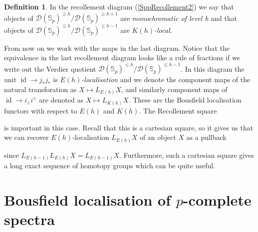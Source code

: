 \documentclass[a4paper]{article} %
\theoremstyle{definition}
\newtheorem{definition}[theorem]{Definition}
\newcommand{\Spp}{\mathcal{D}(\mathbb{S}_p)}
\begin{document}
\begin{definition}
In the recollement diagram (\ref{SppRecollement2}) we say that objects of $\Spp^{\ge h}/\Spp^{\ge h+1}$ are \textit{monochromatic of level h} and that objects of $\Spp^{\le h}/\Spp^{\le h-1}$ are $K(h)$\textit{-local}.
\end{definition}
From now on we work with the maps in the last diagram. Notice that the equivalence in the last recollement diagram looks like a rule of fractions if we write out the Verdier quotient $\Spp^{\le h} / \Spp^{\le h -1}$. In this diagram the unit $\operatorname{id} \to j_*j_*$ is $E(h)$\textit{-localisation} and we denote the component maps of the natural transforation as $X \mapsto L_{E(h)}X$, and similarly component maps of $\operatorname{id} \to i_\wedge i^\wedge$ are denoted as $X \mapsto L_{K(h)}X$. These are the Bousfield localisation functors with respect to $E(h)$ and $K(h)$. The Recollement square
\begin{center}
\end{center}
is important in this case. Recall that this is a cartesian square, so it gives us that we can recover $E(h)$-localisation $L_{E(h)}X$ of an object $X$ as a pullback
\begin{center}
\end{center}
since $L_{E(h-1)}L_{E(h)}X = L_{E(h-1)}X$. Furthermore, such a cartesian square gives a long exact sequence of homotopy groups which can be quite useful.

\section{Bousfield localisation of $p$-complete spectra}\label{Section:bousfieldlocal}
\end{document}
